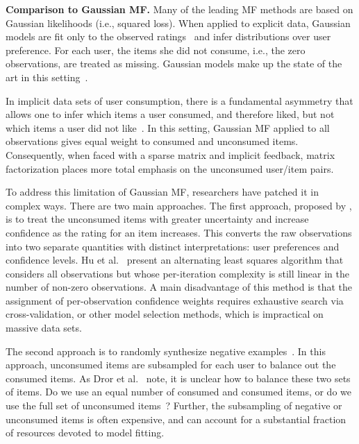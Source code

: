 {\bf Comparison to Gaussian MF.} Many of the leading MF methods are
based on Gaussian likelihoods (i.e., squared loss). When applied to
explicit data, Gaussian models are fit only to the observed
ratings~\cite{Koren:2009} and infer distributions over user
preference. For each user, the items she did not consume, i.e., the
zero observations, are treated as missing. Gaussian models make up the
state of the art in this setting~\cite{Salakhutdinov:2008,
  Salakhutdinov:2008a,Koren:2009}.

In implicit data sets of user consumption, there is a fundamental
asymmetry that allows one to infer which items a user consumed, and
therefore liked, but not which items a user did not
like~\cite{Hu:2008p9402}. In this setting, Gaussian MF applied to all
observations gives equal weight to consumed and unconsumed items.
Consequently, when faced with a sparse matrix and implicit feedback,
matrix factorization places more total emphasis on the unconsumed
user/item pairs.

To address this limitation of Gaussian MF, researchers have patched it
in complex ways. There are two main approaches. The first approach,
proposed by \cite{Hu:2008p9402}, is to treat the unconsumed items with
greater uncertainty and increase confidence as the rating for an item
increases. This converts the raw observations into two separate
quantities with distinct interpretations: user preferences and
confidence levels. Hu et al.~\cite{Hu:2008p9402} present an
alternating least squares algorithm that considers all observations
but whose per-iteration complexity is still linear in the number of
non-zero observations. A main disadvantage of this method is that the
assignment of per-observation confidence weights requires exhaustive
search via cross-validation, or other model selection methods, which
is impractical on massive data sets.

The second approach is to randomly synthesize negative
examples~\cite{Dror:2012a, Gantner:2012p9364, Paquet:2013p9197}. In
this approach, unconsumed items are subsampled for each user to
balance out the consumed items. As Dror et al.~\cite{Dror:2012a} note,
it is unclear how to balance these two sets of items. Do we use an
equal number of consumed and consumed items, or do we use the full set
of unconsumed items~\cite{Cremonesi:2010, Hu:2008p9402}?  Further, the
subsampling of negative or unconsumed items is often expensive, and
can account for a substantial fraction of resources devoted to model
fitting.

